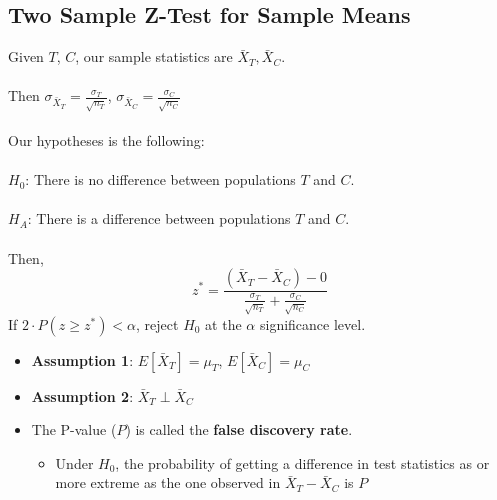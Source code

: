 \documentclass{article}
\begin{document}
\subsection{Two Sample Z-Test for Sample Means}
Given $T$, $C$, our sample statistics are $\bar{X}_T, \bar{X}_C$.
\\
\\
Then $\sigma_{\bar{X}_T} = \frac{\sigma_T}{\sqrt {n_T}}$, $\sigma_{\bar{X}_C} = \frac{\sigma_C}{\sqrt {n_C}}$
\\
\\
Our hypotheses is the following:
\\
\\
$H_0$: There is no difference between populations $T$ and $C$. 
\\
\\
$H_A$: There is a difference between populations $T$ and $C$.
\\
\\
Then,
\[
    z^* = \frac{(\bar{X}_T - \bar{X}_C) - 0}{\frac{\sigma_T}{\sqrt {n_T}} + \frac{\sigma_C}{\sqrt {n_C}}}
\]
If $2 \cdot P(z \geq z^*) < \alpha$, reject $H_0$ at the $\alpha$ significance level.
\begin{itemize}
    \item \textbf{Assumption 1}: $E[\bar{X}_T] = \mu_T$, $E[\bar{X}_C] = \mu_C$
    \item \textbf{Assumption 2}: $\bar{X}_T \perp \bar{X}_C$
    \item The P-value ($P$) is called the \textbf{false discovery rate}.
    \begin{itemize}
        \item Under $H_0$, the probability of getting a difference in test statistics as or more extreme as the one observed in $\bar{X}_T - \bar{X}_C$ is $P$
    \end{itemize}
\end{itemize}
\end{document}
